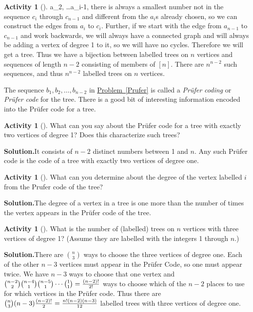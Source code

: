 \documentclass[10pt,]{book}
\theoremstyle{plain}
\theoremstyle{definition}
\newtheorem{activity}[project]{Activity}
\numberwithin{equation}{chapter}
\begin{document}
\begin{activity}[]
a_2, \ldots a_{i-1}\), there is always a smallest number not in the sequence \(c_i\) through \(c_{n-1}\) and different from the \(a_i\)s already chosen, so we can construct the edges from \(a_i\) to \(c_i\). Further, if we start with the edge from \(a_{n-1}\) to \(c_{n-1}\) and work backwards, we will always have a connected graph and will always be adding a vertex of degree 1 to it, so we will have no cycles. Therefore we will get a tree. Thus we have a bijection between labelled trees on \(n\) vertices and sequences of length \(n-2\) consisting of members of \([n]\). There are \(n^{n-2}\) such sequences, and thus \(n^{n-2}\) labelled trees on \(n\) vertices.%
\end{activity}
The sequence \(b_1,b_2,\ldots, b_{n-2}\) in \hyperref[Prufer]{Problem~\ref{Prufer}} is called a \emph{Prüfer coding} or \emph{Prüfer code} for the tree. There is a good bit of interesting information encoded into the Prüfer code for a tree.%
\begin{activity}[]\label{activity-53}
What can you say about the Prüfer code for a tree with exactly two vertices of degree 1? Does this characterize such trees?%
\par\medskip\noindent%
\textbf{Solution.}\quad It consists of \(n-2\) distinct numbers between 1 and \(n\). Any such Prüfer code is the code of a tree with exactly two vertices of degree one.%
\end{activity}
\begin{activity}[]\label{activity-54}
What can you determine about the degree of the vertex labelled \(i\) from the Prufer code of the tree?%
\par\medskip\noindent%
\textbf{Solution.}\quad The degree of a vertex in a tree is one more than the number of times the vertex appears in the Prüfer code of the tree.%
\end{activity}
\begin{activity}[]\label{activity-55}
What is the number of (labelled) trees on \(n\) vertices with three vertices of degree 1? (Assume they are labelled with the integers 1 through \(n\).)%
\par\medskip\noindent%
\textbf{Solution.}\quad There are \(n\choose 3\) ways to choose the three vertices of degree one. Each of the other \(n-3\) vertices must appear in the Prüfer Code, so one must appear twice. We have \(n-3\) ways to choose that one vertex and \({n-2\choose 2}{n-4\choose1}{n-5\choose1}\cdots{1\choose1} ={(n-2)!\over 2!}\) ways to choose which of the \(n-2\) places to use for which vertices in the Prüfer code. Thus there are \({n\choose3}(n-3){(n-2)!\over 2}= {n!(n-2)(n-3)\over 12}\) labelled trees with three vertices of degree one.%
\end{activity}
\typeout{************************************************}
\typeout{************************************************}
\end{document}
